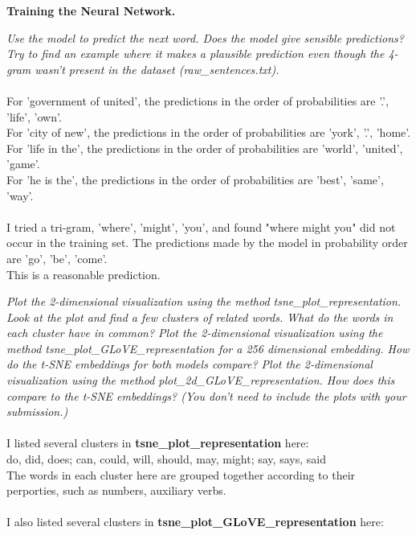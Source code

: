 \documentclass{myhw}
\begin{document}
\begin{homeworkProblem}
\textbf{Training the Neural Network.}
\begin{homeworkSection}
\emph{Use the model to predict the next word. Does the model give sensible predictions? Try to find an example where it makes a plausible prediction even though the 4-gram wasn’t present in the dataset (raw\_sentences.txt). } \\
\\
For 'government of united', the predictions in the order of probabilities are '.', 'life', 'own'. \\
For 'city of new', the predictions in the order of probabilities are 'york', '.', 'home'.\\
For 'life in the', the predictions in the order of probabilities are 'world', 'united', 'game'.\\
For 'he is the', the predictions in the order of probabilities are 'best', 'same', 'way'. \\
\\
I tried a tri-gram, 'where', 'might', 'you', and found "where might you" did not occur in the training set. The predictions made by the model in probability order are 'go', 'be', 'come'. \\
This is a reasonable prediction.
\end{homeworkSection}
\begin{homeworkSection}
\emph{Plot the 2-dimensional visualization using the method tsne\_plot\_representation. Look at the plot and find a few clusters of related words. What do the words in each cluster have in common? Plot the 2-dimensional visualization using the method tsne\_plot\_GLoVE\_representation for a 256 dimensional embedding. How do the t-SNE embeddings for both models compare? Plot the 2-dimensional visualization using the method plot\_2d\_GLoVE\_representation. How does this compare to the t-SNE embeddings? (You don’t need to include the plots with your submission.)} \\
\\
I listed several clusters in \textbf{tsne\_plot\_representation} here: \\
do, did, does; 
can, could, will, should, may, might; 
say, says, said \\
The words in each cluster here are grouped together according to their perporties, such as numbers, auxiliary verbs. \\
\\
I also listed several clusters in \textbf{tsne\_plot\_GLoVE\_representation} here: \\

\end{homeworkSection}
\end{homeworkProblem}
\end{document}
